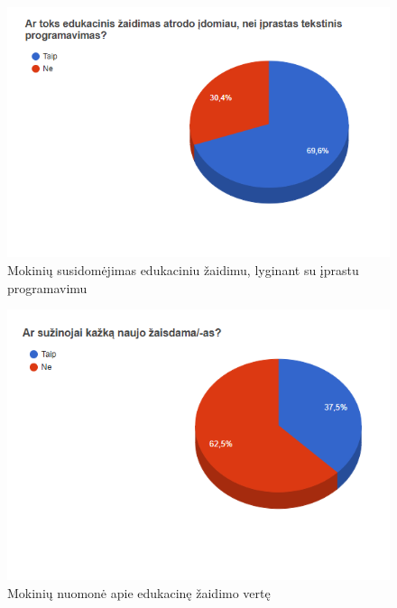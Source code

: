 \documentclass{VUMIFPSkursinis}
\begin{document}
\begin{figure}[H]
\centering
\includegraphics[scale=0.8]{img/idomiauNei.png}
\caption{Mokinių susidomėjimas edukaciniu žaidimu, lyginant su įprastu programavimu}
\label{img:susidomejimas}
\end{figure}

\begin{figure}[H]
\centering
\includegraphics[scale=0.8]{img/arSuzinojai.png}
\caption{Mokinių nuomonė apie edukacinę žaidimo vertę}
\label{img:arSuzinojai}
\end{figure}
\end{document}
